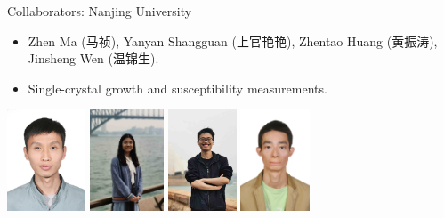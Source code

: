 \documentclass[xcolor=table, aspectratio=1610,ignorenonframetext]{beamer}
\begin{document}
\begin{frame}{Collaborators: Nanjing University}
\begin{itemize}
	\item Zhen Ma (马祯), Yanyan Shangguan (上官艳艳), Zhentao Huang (黄振涛), Jinsheng Wen (温锦生).
	\item Single-crystal growth and susceptibility measurements.
\end{itemize}
	\begin{center}
		\includegraphics[height=3cm]{../people/zhenma}
		\includegraphics[height=3cm]{../people/yanyanshangguan}
		\includegraphics[height=3cm]{../people/zhentaohuang}
		\includegraphics[height=3cm]{../people/jinshengwen}
	\end{center}
\end{frame}
\end{document}
